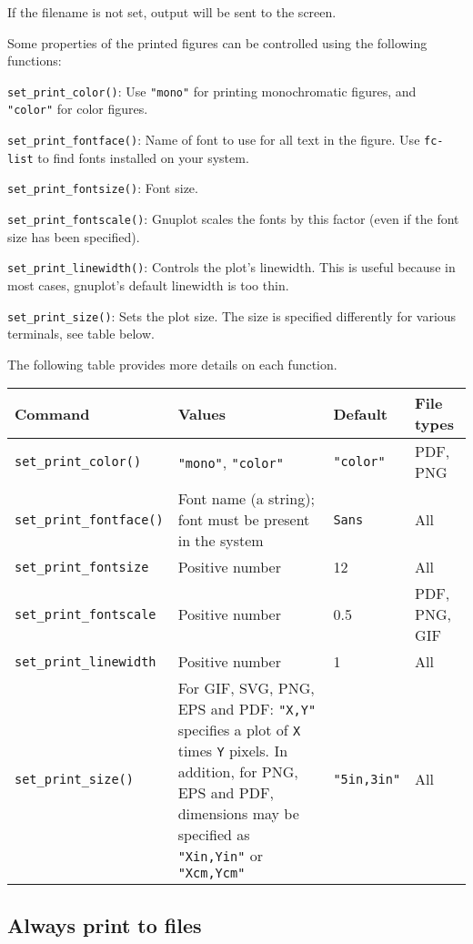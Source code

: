 \documentclass[11pt]{article}
\newcommand{\cmd}[1]{\texttt{#1}}
\begin{document}
If the filename is not set, output will be sent to the screen.

Some properties of the printed figures can be controlled using the following
functions:

\cmd{set\_print\_color()}: Use \cmd{"mono"} for printing monochromatic figures,
and \cmd{"color"} for color figures.

\cmd{set\_print\_fontface()}: Name of font to use for all text in the figure. Use
\cmd{fc-list} to find fonts installed on your system.

\cmd{set\_print\_fontsize()}: Font size.

\cmd{set\_print\_fontscale()}: Gnuplot scales the fonts by this factor (even
if the font size has been specified).

\cmd{set\_print\_linewidth()}: Controls the plot's linewidth. This is useful
because in most cases, gnuplot's default linewidth is too thin.

\cmd{set\_print\_size()}: Sets the plot size. The size is specified differently
for various terminals, see table below.

The following table provides more details on each function.

\begin{center}
\begin{tabular}{lp{4cm}ll}
	\toprule
	\textbf{Command} & \textbf{Values} & \textbf{Default} & \textbf{File types}
	\\
	\midrule
	\cmd{set\_print\_color()} & \cmd{"mono"}, \cmd{"color"} & \cmd{"color"} &
	PDF, PNG \\
	\cmd{set\_print\_fontface()} & Font name (a string); font must be present
	in the system & \cmd{Sans} & All \\
	\cmd{set\_print\_fontsize} & Positive number & 12 & All \\
	\cmd{set\_print\_fontscale} & Positive number & 0.5 & PDF, PNG, GIF \\
	\cmd{set\_print\_linewidth} & Positive number & 1 & All \\
	\cmd{set\_print\_size()} & For GIF, SVG, PNG, EPS and PDF: \cmd{"X,Y"}
	specifies a plot of
	\cmd{X} times \cmd{Y} pixels. In addition, for PNG, EPS and PDF, dimensions
	may be specified as \cmd{"Xin,Yin"} or \cmd{"Xcm,Ycm"} & \cmd{"5in,3in"} &
	All \\
	\bottomrule
\end{tabular}
\end{center}

\subsection{Always print to files}
\end{document}
